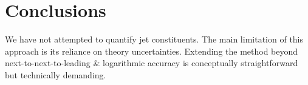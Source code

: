 \section{Conclusions}\label{sec:conclusions}

We have not attempted to quantify jet constituents. The main limitation
of this approach is its reliance on theory uncertainties. Extending the
method beyond next-to-next-to-leading & logarithmic accuracy is
conceptually straightforward but technically demanding.

